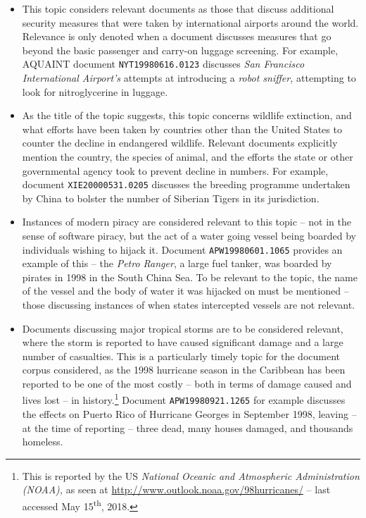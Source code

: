 \begin{itemize}
    
    \item[]{ This topic considers relevant documents as those that discuss additional security measures that were taken by international airports around the world. Relevance is only denoted when a document discusses measures that go beyond the basic passenger and carry-on luggage screening. For example, AQUAINT document \texttt{NYT19980616.0123} discusses \emph{San Francisco International Airport's} attempts at introducing a \emph{robot sniffer,} attempting to look for nitroglycerine in luggage.}
    
    \item[]{ As the title of the topic suggests, this topic concerns wildlife extinction, and what efforts have been taken by countries other than the United States to counter the decline in endangered wildlife. Relevant documents explicitly mention the country, the species of animal, and the efforts the state or other governmental agency took to prevent decline in numbers. For example, document \texttt{XIE20000531.0205} discusses the breeding programme undertaken by China to bolster the number of Siberian Tigers in its jurisdiction.}
    
    \item[]{ Instances of modern piracy are considered relevant to this topic -- not in the sense of software piracy, but the act of a water going vessel being boarded by individuals wishing to hijack it. Document \texttt{APW19980601.1065} provides an example of this -- the \emph{Petro Ranger}, a large fuel tanker, was boarded by pirates in 1998 in the South China Sea. To be relevant to the topic, the name of the vessel and the body of water it was hijacked on must be mentioned -- those discussing instances of when states intercepted vessels are not relevant.}
    
    \item[]{ Documents discussing major tropical storms are to be considered relevant, where the storm is reported to have caused significant damage and a large number of casualties. This is a particularly timely topic for the document corpus considered, as the 1998 hurricane season in the Caribbean has been reported to be one of the most costly -- both in terms of damage caused and lives lost -- in history.\footnote{This is reported by the US \emph{National Oceanic and Atmospheric Administration (NOAA),} as seen at \url{http://www.outlook.noaa.gov/98hurricanes/} -- last accessed May 15\textsuperscript{th}, 2018.} Document \texttt{APW19980921.1265} for example discusses the effects on Puerto Rico of Hurricane Georges in September 1998, leaving -- at the time of reporting -- three dead, many houses damaged, and thousands homeless.}
    

\end{itemize}
